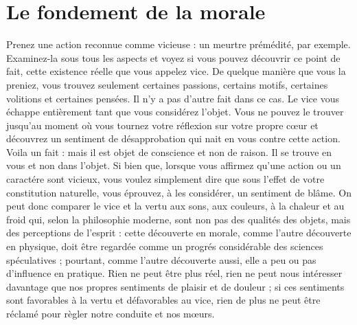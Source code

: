 
\section{Le fondement de la morale}
Prenez une action reconnue comme vicieuse : un meurtre
prémédité, par exemple. Examinez-la sous tous les aspects
et voyez si vous pouvez découvrir ce point de fait, cette
existence réelle que vous appelez vice. De quelque manière
que vous la preniez, vous trouvez seulement certaines
passions, certains motifs, certaines volitions et certaines
pensées. Il n’y a pas d’autre fait dans ce cas. Le vice vous
échappe entièrement tant que vous considérez l'objet.
Vous ne pouvez le trouver jusqu’au moment où vous
tournez votre réflexion sur votre propre c{\oe}ur et découvrez
un sentiment de désapprobation qui nait en vous contre
cette action. Voila un fait : mais il est objet de conscience
et non de raison. Il se trouve en vous et non dans l'objet.
Si bien que, lorsque vous affirmez qu’une action ou un
caractére sont vicieux, vous voulez simplement dire que
sous l’effet de votre constitution naturelle, vous éprouvez,
à les considérer, un sentiment de blâme. On peut donc
comparer le vice et la vertu aux sons, aux couleurs, à la
chaleur et au froid qui, selon la philosophie moderne, sont
non pas des qualités des objets, mais des perceptions de
l'esprit : cette découverte en morale, comme l'autre
découverte en physique, doit être regardée comme un
progrés considérable des sciences spéculatives ; pourtant,
comme l’autre découverte aussi, elle a peu ou pas d’influence
en pratique. Rien ne peut être plus réel, rien ne
peut nous intéresser davantage que nos propres sentiments
de plaisir et de douleur ; si ces sentiments sont favorables
à la vertu et défavorables au vice, rien de plus ne peut
être réclamé pour règler notre conduite et nos m{\oe}urs.

